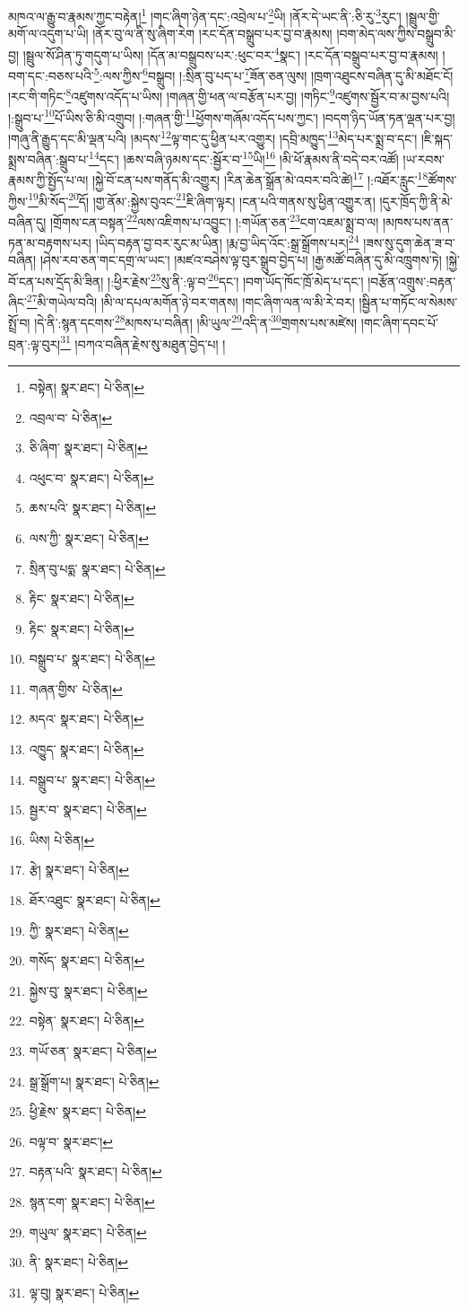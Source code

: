 མཁའ་ལ་རྒྱུ་བ་རྣམས་ཀྱང་བརྟེན།\footnote{བསྟེན།  སྣར་ཐང་།  པེ་ཅིན། } །གང་ཞིག་ཉེན་དང་:འབྲེལ་པ་\footnote{འབྲལ་བ་  པེ་ཅིན། }ཡི། །ནོར་དེ་ཡང་ནི་:ཅི་རུ་\footnote{ཅི་ཞིག་  སྣར་ཐང་།  པེ་ཅིན། }རུང་། །སྦྲུལ་གྱི་མགོ་ལ་འདུག་པ་ཡི། །ནོར་བུ་ལ་ནི་སུ་ཞིག་རེག །རང་དོན་བསྒྲུབ་པར་བྱ་བ་རྣམས། །བག་མེད་ལས་ཀྱིས་བསྒྲུབ་མི་བྱ། །སྦྲུལ་སོ་ཤིན་ཏུ་གདུག་པ་ཡིས། །དོན་མ་བསྒྲུབས་པར་:ཕུང་བར་\footnote{འཕུང་བ་  སྣར་ཐང་།  པེ་ཅིན། }སྣང་། །རང་དོན་བསྒྲུབ་པར་བྱ་བ་རྣམས། །བག་དང་:བཅས་པའི་\footnote{ཆས་པའི་  སྣར་ཐང་།  པེ་ཅིན། }:ལས་ཀྱིས་\footnote{ལས་ཀྱི་  སྣར་ཐང་།  པེ་ཅིན། }བསྒྲུབ། །:སྲིན་བུ་པད་པ་\footnote{སྲིན་བུ་པདྨ་  སྣར་ཐང་།  པེ་ཅིན། }ཟོན་ཅན་ལུས། །ཁྲག་འཐུངས་བཞིན་དུ་མི་མཐོང་ངོ། །རང་གི་གཏིང་\footnote{རྟིང་  སྣར་ཐང་།  པེ་ཅིན། }འཛུགས་འདོད་པ་ཡིས། །གཞན་གྱི་ཕན་ལ་བརྩོན་པར་བྱ། །གཏིང་\footnote{རྟིང་  སྣར་ཐང་།  པེ་ཅིན། }འཛུགས་སྦྱོར་བ་མ་བྱས་པའི། །:སྒྲུབ་པ་\footnote{བསྒྲུབ་པ་  སྣར་ཐང་།  པེ་ཅིན། }པོ་ཡིས་ཅི་མི་འགྲུབ། །:གཞན་གྱི་\footnote{གཞན་གྱིས་  པེ་ཅིན། }ཕྱོགས་གཞོམ་འདོད་པས་ཀྱང་། །བདག་ཉིད་ཡོན་ཏན་ལྡན་པར་བྱ། །གཞུ་ནི་རྒྱུད་དང་མི་ལྡན་པའི། །མདས་\footnote{མདའ་  སྣར་ཐང་།  པེ་ཅིན། }ལྟ་གང་དུ་ཕྱིན་པར་འགྱུར། །དབྲི་མཁྱུད་\footnote{འཁྱུད་  སྣར་ཐང་།  པེ་ཅིན། }མེད་པར་སྨྲ་བ་དང་། །ཇི་སྐད་སྨྲས་བཞིན་:སྒྲུབ་པ་\footnote{བསྒྲུབ་པ་  སྣར་ཐང་།  པེ་ཅིན། }དང་། །ཆས་བཞི་ཉམས་དང་:སྦྱོར་བ་\footnote{སྦྱར་བ་  སྣར་ཐང་།  པེ་ཅིན། }ཡི།\footnote{ཡིས།  པེ་ཅིན། } །མི་ཕོ་རྣམས་ནི་བདེ་བར་འཚོ། །ཡ་རབས་རྣམས་ཀྱི་སྤྱོད་པ་ལ། །སྐྱེ་བོ་ངན་པས་གནོད་མི་འགྱུར། །རིན་ཆེན་སྒྲོན་མེ་འབར་བའི་ཚེ།\footnote{རྩེ།  སྣར་ཐང་།  པེ་ཅིན། } །:འཐོར་རླུང་\footnote{ཐོར་འཐུང་  སྣར་ཐང་།  པེ་ཅིན། }ཚོགས་ཀྱིས་\footnote{ཀྱི་  སྣར་ཐང་།  པེ་ཅིན། }མི་སོད་\footnote{གསོད་  སྣར་ཐང་།  པེ་ཅིན། }དོ། །གྱ་ནོམ་:སྐྱེས་བུའང་\footnote{སྐྱེས་བུ་  སྣར་ཐང་།  པེ་ཅིན། }ཇི་ཞིག་ལྟར། །ངན་པའི་གནས་སུ་ཕྱིན་འགྱུར་ན། །དུར་ཁྲོད་ཀྱི་ནི་མེ་བཞིན་དུ། །གྲོགས་ངན་བསྟན་\footnote{བསྟེན་  སྣར་ཐང་།  པེ་ཅིན། }ལས་འཇིགས་པ་འབྱུང་། །:གཡོན་ཅན་\footnote{གཡོ་ཅན་  སྣར་ཐང་།  པེ་ཅིན། }ངག་འཇམ་སྨྲ་བ་ལ། །མཁས་པས་ནན་ཏན་མ་བརྟགས་པར། །ཡིད་བརྟན་བྱ་བར་རུང་མ་ཡིན། །རྨ་བྱ་ཡིད་འོང་:སྒྲ་སྒྲོགས་པར།\footnote{སྒྲ་སྒྲོག་པ།  སྣར་ཐང་།  པེ་ཅིན། } །ཟས་སུ་དུག་ཆེན་ཟ་བ་བཞིན། །ཤེས་རབ་ཅན་གང་དགྲ་ལ་ཡང་། །མཛའ་བཤེས་ལྟ་བུར་སྒྲུབ་བྱེད་པ། །རྒྱ་མཚོ་བཞིན་དུ་མི་འཁྲུགས་ཏེ། །སྐྱེ་བོ་ངན་པས་དྲོད་མི་ཟིན། །:ཕྱིར་རྗེས་\footnote{ཕྱི་རྗེས་  སྣར་ཐང་།  པེ་ཅིན། }སུ་ནི་:ལྟ་བ་\footnote{བལྟ་བ་  སྣར་ཐང་། }དང་། །བག་ཡོད་ཁོང་ཁྲོ་མེད་པ་དང་། །བརྩོན་འགྲུས་:བརྟན་ཞིང་\footnote{བརྟན་པའི་  སྣར་ཐང་།  པེ་ཅིན། }མི་གཡེལ་བའི། །མི་ལ་དཔལ་མགོན་ཉེ་བར་གནས། །གང་ཞིག་ལན་ལ་མི་རེ་བར། །སྦྱིན་པ་གཏོང་ལ་སེམས་སྤྲོ་བ། །དེ་ནི་:སྙན་དངགས་\footnote{སྙན་ངག་  སྣར་ཐང་།  པེ་ཅིན། }མཁས་པ་བཞིན། །མི་ཡུལ་\footnote{གཡུལ་  སྣར་ཐང་།  པེ་ཅིན། }འདི་ན་\footnote{ནི་  སྣར་ཐང་།  པེ་ཅིན། }གྲགས་པས་མཛེས། །གང་ཞིག་དབང་པོ་བྲན་:ལྟ་བུར།\footnote{ལྟ་བུ།  སྣར་ཐང་།  པེ་ཅིན། } །བཀའ་བཞིན་རྗེས་སུ་མཐུན་བྱེད་པ། །
